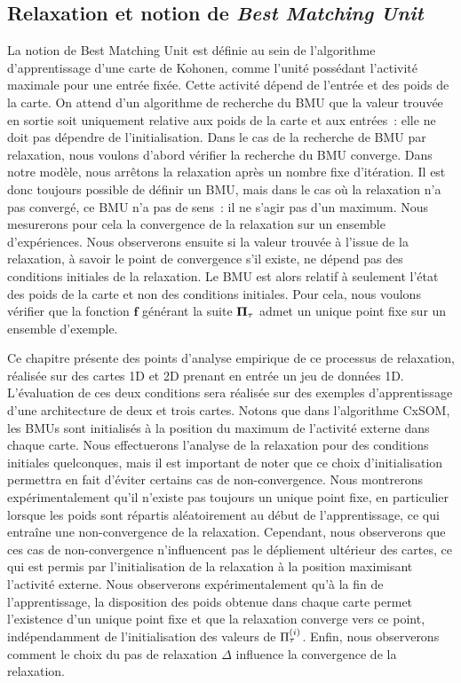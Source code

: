\documentclass[../main]{subfiles}
\begin{document}
\subsection{Relaxation et notion de \emph{Best Matching Unit}}

La notion de Best Matching Unit est définie au sein de l'algorithme d'apprentissage d'une carte de Kohonen, comme l'unité possédant l'activité maximale pour une entrée fixée. 
Cette activité dépend de l'entrée et des poids de la carte.
On attend d'un algorithme de recherche du BMU que la valeur trouvée en sortie soit uniquement relative aux poids de la carte et aux entrées~: elle ne doit pas dépendre de l'initialisation.
Dans le cas de la recherche de BMU par relaxation, nous voulons d'abord vérifier la recherche du BMU converge. 
Dans notre modèle, nous arrêtons la relaxation après un nombre fixe d'itération. Il est donc toujours possible de définir un BMU, mais dans le cas où la relaxation n'a pas convergé, ce BMU n'a pas de sens~: il ne s'agir pas d'un maximum. 
Nous mesurerons pour cela la convergence de la relaxation sur un ensemble d'expériences.
Nous observerons ensuite si la valeur trouvée à l'issue de la relaxation, à savoir le point de convergence s'il existe, ne dépend pas des conditions initiales de la relaxation.
Le BMU est alors relatif à seulement l'état des poids de la carte et non des conditions initiales. Pour cela, nous voulons vérifier que la fonction $\mathbf{f}$ générant la suite $\mathbf{\Pi}_\tau$ admet un unique point fixe sur un ensemble d'exemple. 

Ce chapitre présente des points d'analyse empirique de ce processus de relaxation, réalisée sur des cartes 1D et 2D prenant en entrée un jeu de données 1D.
L'évaluation de ces deux conditions sera réalisée sur des exemples d'apprentissage d'une architecture de deux et trois cartes. 
Notons que dans l'algorithme CxSOM, les BMUs sont initialisés à la position du maximum de l'activité externe dans chaque carte. 
Nous effectuerons l'analyse de la relaxation pour des conditions initiales quelconques, mais il est important de noter que ce choix d'initialisation permettra en fait d'éviter certains cas de non-convergence.
Nous montrerons expérimentalement qu'il n'existe pas toujours un unique point fixe, en particulier lorsque les poids sont répartis aléatoirement au début de l'apprentissage, ce qui entraîne une non-convergence de la relaxation. 
Cependant, nous observerons que ces cas de non-convergence n'influencent pas le dépliement ultérieur des cartes, ce qui est permis par l'initialisation de la relaxation à la position maximisant l'activité externe.
Nous observerons expérimentalement qu'à la fin de l'apprentissage, la disposition des poids obtenue dans chaque carte permet l'existence d'un unique point fixe et que la relaxation converge vers ce point, indépendamment de l'initialisation des valeurs de $\Pi^{({i})}_{\tau}$.
Enfin, nous observerons comment le choix du pas de relaxation $\Delta$ influence la convergence de la relaxation.
\end{document}
